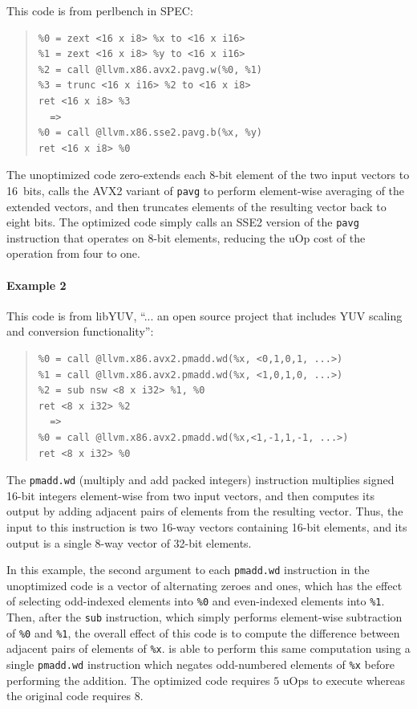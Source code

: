 This code is from perlbench in SPEC:

{\small\begin{quote}\begin{verbatim}
%0 = zext <16 x i8> %x to <16 x i16>
%1 = zext <16 x i8> %y to <16 x i16>
%2 = call @llvm.x86.avx2.pavg.w(%0, %1)
%3 = trunc <16 x i16> %2 to <16 x i8>
ret <16 x i8> %3
  =>
%0 = call @llvm.x86.sse2.pavg.b(%x, %y)
ret <16 x i8> %0
\end{verbatim}
\end{quote}}

The unoptimized code zero-extends each 8-bit element of the two input
vectors to 16~bits, calls the AVX2 variant of \texttt{pavg} to perform
element-wise averaging of the extended vectors, and then truncates
elements of the resulting vector back to eight bits.
%
The optimized code simply calls an SSE2 version of the \texttt{pavg}
instruction that operates on 8-bit elements, reducing the uOp cost
of the operation from four to one.


\paragraph*{Example 2}

This code is from libYUV, ``... an open source project that includes
YUV scaling and conversion
functionality'':

{\small\begin{quote}\begin{verbatim}
%0 = call @llvm.x86.avx2.pmadd.wd(%x, <0,1,0,1, ...>)
%1 = call @llvm.x86.avx2.pmadd.wd(%x, <1,0,1,0, ...>)
%2 = sub nsw <8 x i32> %1, %0
ret <8 x i32> %2
  =>
%0 = call @llvm.x86.avx2.pmadd.wd(%x,<1,-1,1,-1, ...>)
ret <8 x i32> %0
\end{verbatim}
\end{quote}}

The \texttt{pmadd.wd} (multiply and add packed integers) instruction multiplies
signed 16-bit integers element-wise from two input vectors, and then
computes its output by adding adjacent pairs of elements from the
resulting vector.
%
Thus, the input to this instruction is two 16-way vectors containing
16-bit elements, and its output is a single 8-way vector of 32-bit
elements.


In this example, the second argument to each \texttt{pmadd.wd}
instruction in the unoptimized code is a vector of alternating zeroes
and ones, which has the effect of selecting odd-indexed elements into
\texttt{\%0} and even-indexed elements into \texttt{\%1}.
%
Then, after the \texttt{sub} instruction, which simply performs
element-wise subtraction of \texttt{\%0} and \texttt{\%1}, the overall
effect of this code is to compute the difference between adjacent
pairs of elements of \texttt{\%x}.
%
\minotaur{} is able to perform this same computation using a single
\texttt{pmadd.wd} instruction which negates odd-numbered elements of
\texttt{\%x} before performing the addition.
%
The optimized code requires $5$ uOps to execute whereas the original
code requires $8$.


